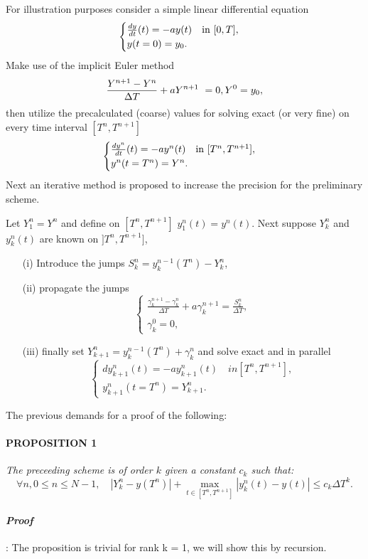 For illustration purposes consider a simple linear differential equation 
\begin{equation}
\begin{cases}
\frac{dy}{dt}(t) = -ay(t) \quad \textnormal{in}\ [0, T], \\
y(t=0) = y_0.
\end{cases}
\end{equation}
Make use of the implicit Euler method
\begin{equation}
\frac{Y^{n+1} - Y^{n}}{\Delta T} + aY^{n+1} = 0, \\
Y^0 = y_0,
\end{equation}
then utilize the precalculated (coarse) values for 
solving exact (or very fine) on every time interval $[T^n, T^{n+1}]$ 
\begin{equation}
\begin{cases}
\frac{dy^n}{dt}(t) = -ay^n(t)\quad \textnormal{in}\ [T^n, T^{n+1}], \\
y^n(t=T^n) = Y^n.
\end{cases}
\end{equation}
Next an iterative method is proposed to increase 
the precision for the preliminary scheme.

Let $Y_1^n = Y^n$ and define on $[T^n, T^{n+1}]$ $y_1^n(t) = y^n(t)$. Next
suppose $Y_k^n$ and $y_k^n(t)$ are known on $]T^n, T^{n+1}]$,
\begin{enumerate}
\item[(i)] Introduce the jumps $S_k^n = y_k^{n-1}(T^n)-Y_k^n$,
\item[(ii)] propagate the jumps
\begin{equation}
\begin{cases}
\frac{\gamma_k^{n+1} - \gamma_k^n}{\Delta T} + a \gamma_k^{n+1} = \frac{S_k^n}{\Delta T},\\
\gamma_k^0 = 0,
\end{cases}
\end{equation}
\item[(iii)] finally set $Y_{k+1}^n = y_k^{n-1}(T^n) + \gamma_k^n$ and solve exact and in parallel
\begin{equation}
\begin{cases}
dy_{k+1}^n(t) = -ay_{k+1}^n(t) \quad in [T^n, T^{n+1}], \\
y_{k+1}^n(t = T^n) = Y_{k+1}^n.
\end{cases}
\end{equation}
\end{enumerate}
The previous demands for a proof of the following:
\paragraph{\textsc{PROPOSITION 1}} \textit{The preceeding scheme is of order $k$ given a constant $c_k$ such that:}
\begin{equation}
\forall n, 0 \leq n \leq N-1, \quad |Y_k^n-y(T^n)|+\max_{t\in[T^n,T^{n+1}]}|y_k^n(t) - y(t)| \leq c_k \Delta T^k.
\end{equation}

\paragraph{\textit{Proof}}: The proposition is trivial for rank k = 1, we will show this by recursion.


